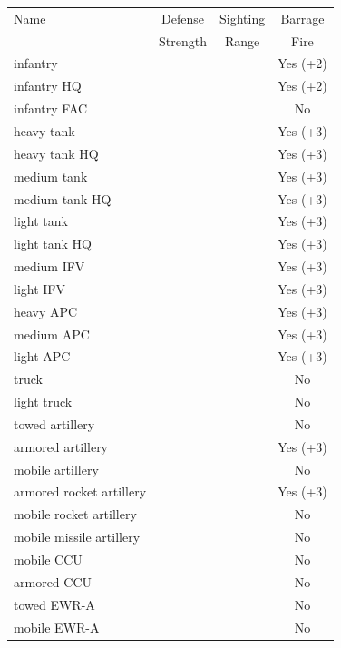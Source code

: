 \begin{tabularx}{0.5\linewidth}{Lccc}
\toprule
Name    &Defense    &Sighting   &Barrage\\
        &Strength   &Range      &Fire\\
\midrule
infantry&&&Yes (+2)\\
infantry HQ&&&Yes (+2)\\
infantry FAC&&&No\\
heavy tank&&&Yes (+3)\\
heavy tank HQ&&&Yes (+3)\\
medium tank&&&Yes (+3)\\
medium tank HQ&&&Yes (+3)\\
light tank&&&Yes (+3)\\
light tank HQ&&&Yes (+3)\\
medium IFV&&&Yes (+3)\\
light IFV&&&Yes (+3)\\
heavy APC&&&Yes (+3)\\
medium APC&&&Yes (+3)\\
light APC&&&Yes (+3)\\
truck&&&No\\
light truck&&&No\\
towed artillery&&&No\\
armored artillery&&&Yes (+3)\\
mobile artillery&&&No\\
armored rocket artillery&&&Yes (+3)\\
mobile rocket artillery&&&No\\
mobile missile artillery&&&No\\
mobile CCU&&&No\\
armored CCU&&&No\\
towed EWR-A&&&No\\
mobile EWR-A&&&No\\

\end{tabularx}
